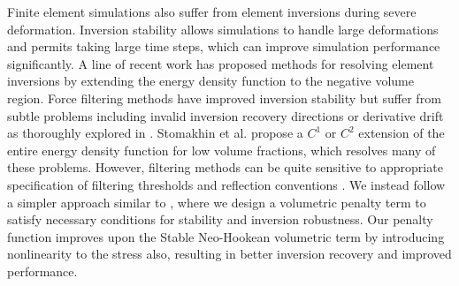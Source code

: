 Finite element simulations also suffer from element inversions during severe deformation.
Inversion stability allows simulations to handle large deformations and permits taking large time
steps, which can improve simulation performance significantly.
A line of recent work has proposed methods for resolving element inversions by extending the energy
density function to the negative volume region.  Force filtering methods
\cite{Irving:2004,Teran:2005} have improved inversion stability but suffer from subtle problems
including invalid inversion recovery directions or derivative drift as thoroughly explored in
\cite{Smith:2018}. Stomakhin et al. \cite{Stomakhin:2012} propose a $C^1$ or $C^2$ extension of the
entire energy density function for low volume fractions, which resolves many of these problems.
However, filtering methods can be quite sensitive to appropriate specification of filtering thresholds
and reflection conventions \cite{wang:2016}. We instead follow a simpler approach similar to \cite{Smith:2018},
where we design a volumetric penalty term to satisfy necessary conditions for stability and inversion
robustness. Our penalty function improves upon the Stable Neo-Hookean volumetric term by introducing nonlinearity
to the stress also, resulting in better inversion recovery and improved performance.